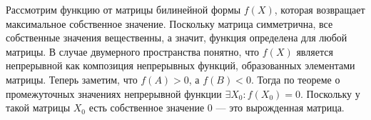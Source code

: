 \documentclass{article}
\begin{document}
Рассмотрим функцию от матрицы билинейной формы $f(X)$, которая возвращает максимальное собственное значение. Поскольку матрица симметрична, все собственные значения вещественны, а значит, 
функция определена для любой матрицы. В случае двумерного пространства понятно, что $f(X)$ является непрерывной как композиция непрерывных функций, образованных элементами матрицы. Теперь заметим, 
что $f(A) > 0$, а $f(B) < 0$. Тогда по теореме о промежуточных значениях непрерывной функции $\exists X_0: f(X_0) = 0$. Поскольку у такой матрицы $X_0$ есть собственное значение $0$ --- это вырожденная матрица.
\end{document}

